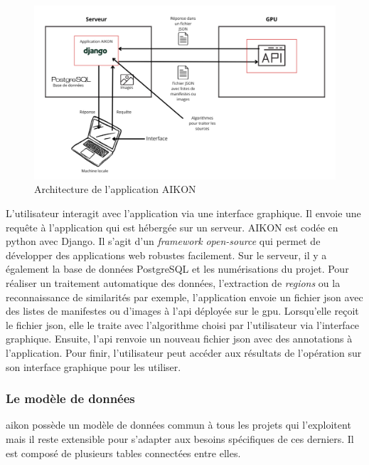 \begin{figure}[H]
	\centering
	\includegraphics[width=1\textwidth]{images/architecture_aikon.png}
	\caption{Architecture de l'application AIKON}
	\label{fig:architecture_aikon}
\end{figure}

L'utilisateur interagit avec l'application via une interface graphique. Il envoie une requête à l'application qui est hébergée sur un serveur. AIKON est codée en python avec Django. Il s'agit d'un \textit{framework} \textit{open-source} qui permet de développer des applications web robustes facilement. Sur le serveur, il y a également la base de données PostgreSQL et les numérisations du projet. Pour réaliser un traitement automatique des données, l'extraction de \textit{regions} ou la reconnaissance de similarités par exemple, l'application envoie un fichier \gls{json} avec des listes de manifestes ou d'images à l'\gls{api} déployée sur le \gls{gpu}. Lorsqu'elle reçoit le fichier  \gls{json}, elle le traite avec l'algorithme choisi par l'utilisateur via l'interface graphique. Ensuite, l'\gls{api} renvoie un nouveau fichier \gls{json} avec des annotations à l'application. Pour finir, l'utilisateur peut accéder aux résultats de l'opération sur son interface graphique pour les utiliser.

\subsubsection{Le modèle de données}

\gls{aikon} possède un modèle de données commun à tous les projets qui l'exploitent mais il reste extensible pour s'adapter aux besoins spécifiques de ces derniers. Il est composé de plusieurs tables connectées entre elles.

